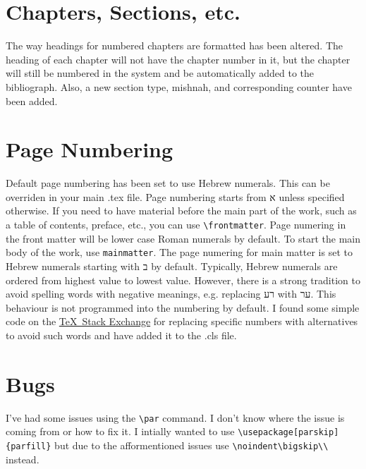 \documentclass[12pt]{article}
\begin{document}
	\section{Chapters, Sections, etc.}
	The way headings for numbered chapters are formatted has been altered. The heading of each chapter will not have the chapter number in it, but the chapter will still be numbered in the system and be automatically added to the bibliograph. Also, a new section type, mishnah, and corresponding counter have been added.
	\section{Page Numbering}
	Default page numbering has been set to use Hebrew numerals. This can be overriden in your main .tex file. Page numbering starts from \texthebrew{א} unless specified otherwise. If you need to have material before the main part of the work, such as a table of contents, preface, etc., you can use \verb|\frontmatter|. Page numering in the front matter will be lower case Roman numerals by default. To start the main body of the work, use \verb|mainmatter|. The page numering for main matter is set to Hebrew numerals starting with \texthebrew{ב} by default. Typically, Hebrew numerals are ordered from highest value to lowest value. However, there is a strong tradition to avoid spelling words with negative meanings, e.g. replacing \texthebrew{רע} with \texthebrew{ער}. This behaviour is not programmed into the numbering by default. I found some simple code on the \href{https://tex.stackexchange.com/questions/300008/modify-specific-hebrew-alpha-numerals-on-page-number}{\TeX\ Stack Exchange} for replacing specific numbers with alternatives to avoid such words and have added it to the .cls file.
	\section{Bugs}
	I've had some issues using the \verb|\par| command. I don't know where the issue is coming from or how to fix it. I intially wanted to use \verb|\usepackage[parskip]{parfill}| but due to the afformentioned issues use \verb|\noindent\bigskip\\| instead.
\end{document}
